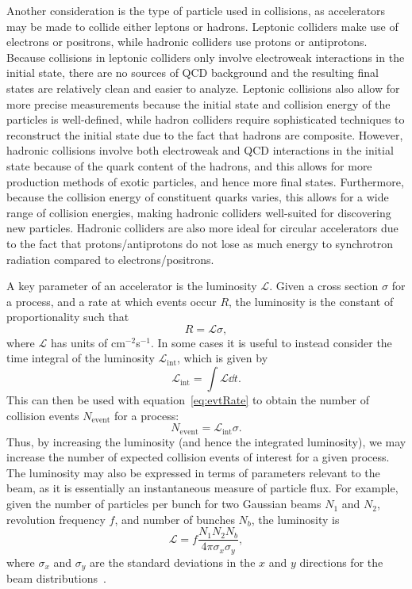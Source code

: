 Another consideration is the type of particle used in collisions, as accelerators may be made to collide either leptons or hadrons.
Leptonic colliders make use of electrons or positrons, while hadronic colliders use protons or antiprotons.
Because collisions in leptonic colliders only involve electroweak interactions in the initial state, there are no sources of QCD background and the resulting final states are relatively clean and easier to analyze.
Leptonic collisions also allow for more precise measurements because the initial state and collision energy of the particles is well-defined, while hadron colliders require sophisticated techniques to reconstruct the initial state due to the fact that hadrons are composite.
However, hadronic collisions involve both electroweak and QCD interactions in the initial state because of the quark content of the hadrons, and this allows for more production methods of exotic particles, and hence more final states.
Furthermore, because the collision energy of constituent quarks varies, this allows for a wide range of collision energies, making hadronic colliders well-suited for discovering new particles.
Hadronic colliders are also more ideal for circular accelerators due to the fact that protons/antiprotons do not lose as much energy to synchrotron radiation compared to electrons/positrons.

A key parameter of an accelerator is the luminosity $\mathcal{L}$.
Given a cross section $\sigma$ for a process, and a rate at which events occur $R$, the luminosity is the constant of proportionality such that
\begin{equation}\label{eq:evtRate}
  R=\mathcal{L}\sigma,
\end{equation}
where $\mathcal{L}$ has units of cm$^{-2}$s$^{-1}$. %
In some cases it is useful to instead consider the time integral of the luminosity $\mathcal{L}_\mathrm{int}$, which is given by
\begin{equation}
  \mathcal{L}_\mathrm{int}=\int\mathcal{L}\dd{t}.
\end{equation}
This can then be used with equation~\ref{eq:evtRate} to obtain the number of collision events $N_\mathrm{event}$ for a process:
\begin{equation}
  N_\mathrm{event}=\mathcal{L}_\mathrm{int}\sigma.
\end{equation}
Thus, by increasing the luminosity (and hence the integrated luminosity), we may increase the number of expected collision events of interest for a given process.
The luminosity may also be expressed in terms of parameters relevant to the beam, as it is essentially an instantaneous measure of particle flux. %
For example, given the number of particles per bunch for two Gaussian beams $N_1$ and $N_2$, revolution frequency $f$, and number of bunches $N_b$, the luminosity is
\begin{equation}
  \mathcal{L}=f\frac{N_1N_2N_b}{4\pi\sigma_x\sigma_y},
\end{equation}
where $\sigma_x$ and $\sigma_y$ are the standard deviations in the $x$ and $y$ directions for the beam distributions~\cite{Herr:941318}.

